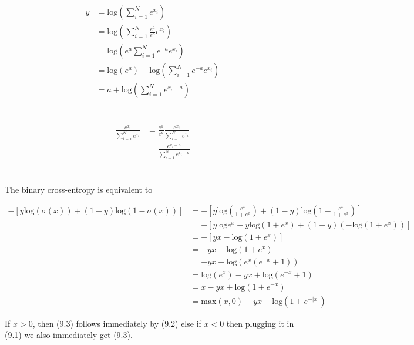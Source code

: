 \documentclass[11pt]{article}
\newcommand{\exercise}{\section{}}
\newcommand{\sumf}[3]{\sum_{#1}^{#2} #3}
\begin{document}
\exercise

\begin{align*}
y &= \text{log}(\sumf{i=1}{N}{ e^{x_i} }) \\
&= \text{log}(\sumf{i=1}{N}{ \frac{e^a}{e^a} e^{x_i} }) \\
&= \text{log}(e^a \sumf{i=1}{N}{e^{-a} e^{x_i} }) \\
&= \text{log}(e^a) + \text{log}(\sumf{i=1}{N}{e^{-a} e^{x_i} }) \\
&= a + \text{log}(\sumf{i=1}{N}{e^{x_i - a} })
\end{align*}

\exercise

\begin{align*}
\frac{e^{x_i}}{\sumf{i=1}{N}{e^{x_i}}} &= \frac{e^{a}}{e^{a}} \frac{e^{x_i}}{\sumf{i=1}{N}{e^{x_i}}} \\
&= \frac{e^{x_i - a}}{\sumf{i=1}{N}{e^{x_i - a}}}
\end{align*}

\exercise

\noindent The binary cross-entropy is equivalent to

\begin{align*}
-[y \text{log}(\sigma(x)) + (1 - y) \text{log}(1 - \sigma(x)) ] &= -[y \text{log}(\frac{e^x}{1 + e^x}) + (1 - y) \text{log}(1 - \frac{e^x}{1 + e^x}) ] \\
&= -[ y \text{log}e^x -y \text{log}(1 + e^x) + (1 - y)( -\text{log}(1 + e^x ))] \\
&= -[yx - \text{log}(1 + e^x )] \\
&= -yx + \text{log}(1 + e^x ) \tag{9.1} \\
&= -yx + \text{log}(e^x(e^{-x} + 1 )) \\
&= \text{log}(e^x) -yx +  \text{log}(e^{-x} + 1 ) \\
&= x -yx + \text{log}( 1 + e^{-x} ) \tag{9.2} \\
&= \text{max}(x,0) -yx + \text{log}( 1 + e^{-|x|} ) \tag{9.3}
\end{align*}

\noindent If $x > 0$, then (9.3) follows immediately by (9.2) else if $x < 0$ then plugging it in (9.1) we also immediately get (9.3).
\end{document}
